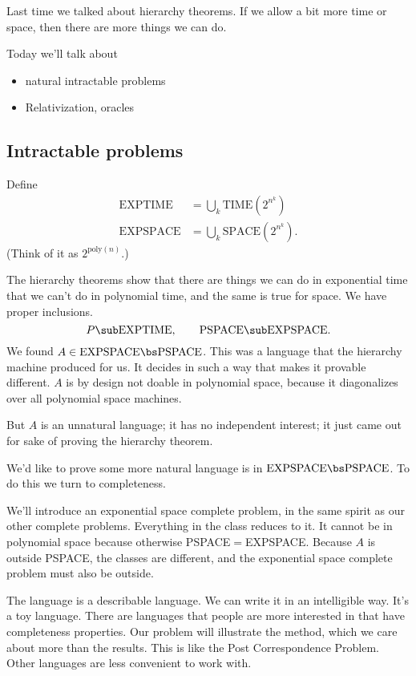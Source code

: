 
Last time we talked about hierarchy theorems. If we allow a bit more time or space, then there are more things we can do. 

Today we'll talk about
\begin{itemize}
\item
natural intractable problems 
\item
Relativization, oracles
\end{itemize}

\subsection{Intractable problems}
\begin{df}
Define
\begin{align*}
\text{EXPTIME}&=\bigcup_k \text{TIME}(2^{n^k})\\
\text{EXPSPACE}&=\bigcup_k \text{SPACE}(2^{n^k}).
\end{align*}
(Think of it as $2^{\text{poly}(n)}$.)
\end{df}
The hierarchy theorems show that %
there are things we can do in exponential time that we can't do in polynomial time, and the same is true for space. We have proper inclusions.
\[
P\sub \text{EXPTIME},\qquad \text{PSPACE}\sub \text{EXPSPACE}.
\]
We found $A\in \text{EXPSPACE}\bs \text{PSPACE}$. This was a language that the hierarchy machine produced for us. It decides in such a way that makes it provable different. $A$ is by design not doable in polynomial space, because it diagonalizes over all polynomial space machines.


But $A$ is an unnatural language; it has no independent interest; it just came out for sake of proving the hierarchy theorem.

We'd like to prove some more natural language is in $\text{EXPSPACE}\bs \text{PSPACE}$. To do this we turn to completeness.

We'll introduce an exponential space complete problem, in the same spirit as our other complete problems.
Everything in the class reduces to it. 
It cannot be in polynomial space because otherwise PSPACE$=$EXPSPACE. Because $A$ is outside PSPACE, the classes are different, and the exponential space complete problem must also be outside.

The language is a describable language. We can write it in an intelligible way. It's a toy language. There are languages that people are more interested in that have completeness properties.
Our problem will illustrate the method, which we care about more than the results. This is like the Post Correspondence Problem. Other languages are less convenient to work with.

